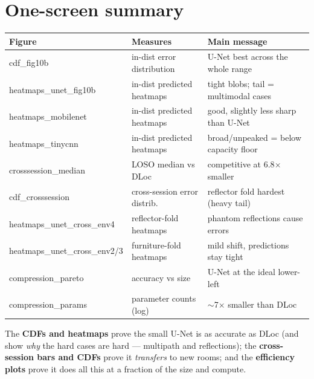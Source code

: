 \documentclass[11pt]{article}
\begin{document}
\section{One-screen summary}

\begin{table}[h]
\centering
\footnotesize
\begin{tabular}{@{}lll@{}}
\toprule
\textbf{Figure} & \textbf{Measures} & \textbf{Main message} \\
\midrule
cdf\_fig10b              & in-dist error distribution      & U-Net best across the whole range \\
heatmaps\_unet\_fig10b   & in-dist predicted heatmaps      & tight blobs; tail = multimodal cases \\
heatmaps\_mobilenet      & in-dist predicted heatmaps      & good, slightly less sharp than U-Net \\
heatmaps\_tinycnn        & in-dist predicted heatmaps      & broad/unpeaked = below capacity floor \\
crosssession\_median     & LOSO median vs DLoc             & competitive at 6.8$\times$ smaller \\
cdf\_crosssession        & cross-session error distrib.\   & reflector fold hardest (heavy tail) \\
heatmaps\_unet\_cross\_env4 & reflector-fold heatmaps      & phantom reflections cause errors \\
heatmaps\_unet\_cross\_env2/3 & furniture-fold heatmaps   & mild shift, predictions stay tight \\
compression\_pareto      & accuracy vs size               & U-Net at the ideal lower-left \\
compression\_params      & parameter counts (log)         & $\sim$7$\times$ smaller than DLoc \\
\bottomrule
\end{tabular}
\end{table}

\begin{readbox}
The \textbf{CDFs and heatmaps} prove the small U-Net is as accurate as DLoc (and show \emph{why} the hard
cases are hard --- multipath and reflections); the \textbf{cross-session bars and CDFs} prove it
\emph{transfers} to new rooms; and the \textbf{efficiency plots} prove it does all this at a fraction of
the size and compute.
\end{readbox}
\end{document}

